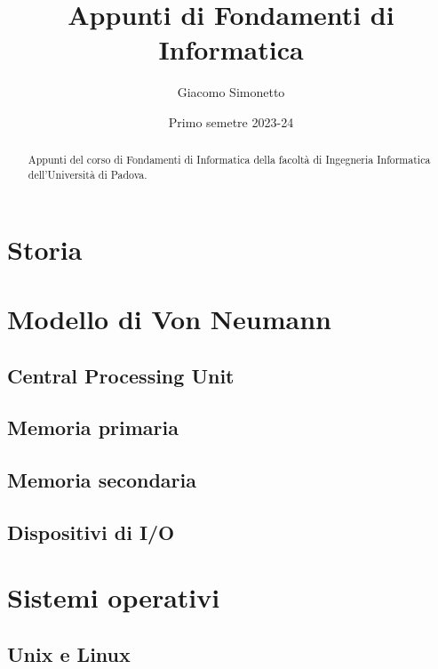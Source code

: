 \documentclass{article}
\title{Appunti di Fondamenti di Informatica}
\author{Giacomo Simonetto}
\date{Primo semetre 2023-24}
\begin{document}
\maketitle
\begin{abstract}
	Appunti del corso di Fondamenti di Informatica della facoltà di Ingegneria Informatica dell'Università di Padova.
\end{abstract}

\newpage

\tableofcontents

\newpage

\section{Storia}

\section{Modello di Von Neumann}
\subsection{Central Processing Unit}
\subsection{Memoria primaria}
\subsection{Memoria secondaria}
\subsection{Dispositivi di I/O}

\section{Sistemi operativi}
\subsection{Unix e Linux}
\end{document}
